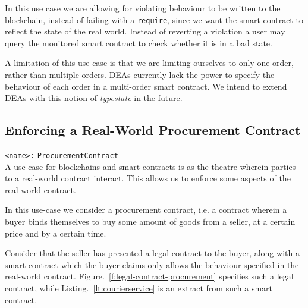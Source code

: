 \documentclass{article}
\begin{document}
  
  In this use case we are allowing for violating behaviour to be written to the blockchain, instead of failing with a \texttt{require}, since we want the smart contract to reflect the state of the real world. Instead of reverting a violation a user may query the monitored smart contract to check whether it is in a bad state. 
  
  A limitation of this use case is that we are limiting ourselves to only one order, rather than multiple orders. DEAs currently lack the power to specify the behaviour of each order in a multi-order smart contract. We intend to extend DEAs with this notion of \emph{typestate} in the future.
  
  
   \subsection{Enforcing a Real-World Procurement Contract}
   
       \texttt{<name>:} \verb+ProcurementContract+\\
   
   A use case for blockchains and smart contracts is as the theatre wherein parties to a real-world contract interact. This allows us to enforce some aspects of the real-world contract.
   
   In this use-case we consider a procurement contract, i.e. a contract wherein a buyer binds themselves to buy some amount of goods from a seller, at a certain price and by a certain time. 
   
   Consider that the seller has presented a legal contract to the buyer, along with a smart contract which the buyer claims only allows the behaviour specified in the real-world contract. Figure.~\ref{f:legal-contract-procurement} specifies such a legal contract, while Listing.~\ref{lt:courierservice} is an extract from such a smart contract.
   
\end{document}
